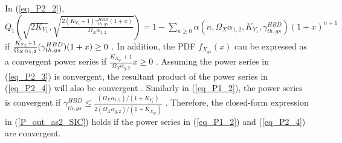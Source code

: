 In (\ref{eq_P2_2}), $Q_1\left( \sqrt{2K_{Y_1}}, \sqrt{\frac{2(K_{Y_1}+1)\gamma_{th,gs}^{HBD}(1+x)}{\Omega_{X}\alpha_{1,2}}} \right) = 1 - \sum_{n\geq0}{\alpha(n,\Omega_X\alpha_{1,2},K_{Y_1},\gamma_{th,gs}^{HBD})(1+x)^{n+1}}$ if $\\ \frac{K_{Y_1}+1}{\Omega_{X}\alpha_{1,2}}(\gamma_{th,gs}^{HBD})(1+x)\geq0$ \cite{andras2011generalized}. In addition, the PDF $f_{X_{gs}}(x)$ can be expressed as a convergent power series if $\frac{K_{X_{gs}}+1}{\Omega_{X}\alpha_{g,2}}x\geq0$ \cite{andras2011generalized}. Assuming the power series in (\ref{eq_P2_3}) is convergent, the resultant product of the power series in (\ref{eq_P2_4}) will also be convergent \cite{bartoszewicz2012algebrability}. Similarly in (\ref{eq_P1_2}), the power series is convergent if $\gamma_{th,gs}^{HBD}\leq \frac{(\Omega_{X}\alpha_{1,2})/(1+K_{Y_1})}{2(\Omega_{X}\alpha_{g,2})/(1+K_{X_{gs}})}$ \cite{rached2016exact}. Therefore, the closed-form expression in (\ref{P_out_as2_SIC}) holds if the power series in (\ref{eq_P1_2}) and (\ref{eq_P2_4}) are convergent.
